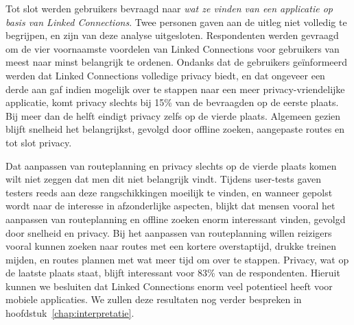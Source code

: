 Tot slot werden gebruikers bevraagd naar \emph{wat ze vinden van een applicatie op basis van Linked Connections}. Twee personen gaven aan de uitleg niet volledig te begrijpen, en zijn van deze analyse uitgesloten.
Respondenten werden gevraagd om de vier voornaamste voordelen van Linked Connections voor gebruikers van meest naar minst belangrijk te ordenen. Ondanks dat de gebruikers geïnformeerd werden dat Linked Connections volledige privacy biedt, en dat ongeveer een derde aan gaf indien mogelijk over te stappen naar een meer privacy-vriendelijke applicatie, komt privacy slechts bij 15\% van de bevraagden op de eerste plaats. Bij meer dan de helft eindigt privacy zelfs op de vierde plaats. Algemeen gezien blijft snelheid het belangrijkst, gevolgd door offline zoeken, aangepaste routes en tot slot privacy.

Dat aanpassen van routeplanning en privacy slechts op de vierde plaats komen wilt niet zeggen dat men dit niet belangrijk vindt. Tijdens user-tests gaven testers reeds aan deze rangschikkingen moeilijk te vinden, en wanneer gepolst wordt naar de interesse in afzonderlijke aspecten, blijkt dat mensen vooral het aanpassen van routeplanning en offline zoeken enorm interessant vinden, gevolgd door snelheid en privacy. Bij het aanpassen van routeplanning willen reizigers vooral kunnen zoeken naar routes met een kortere overstaptijd, drukke treinen mijden, en routes plannen met wat meer tijd om over te stappen. Privacy, wat op de laatste plaats staat, blijft interessant voor 83\% van de respondenten. Hieruit kunnen we besluiten dat Linked Connections enorm veel potentieel heeft voor mobiele applicaties. We zullen deze resultaten nog verder bespreken in hoofdstuk~\ref{chap:interpretatie}.

